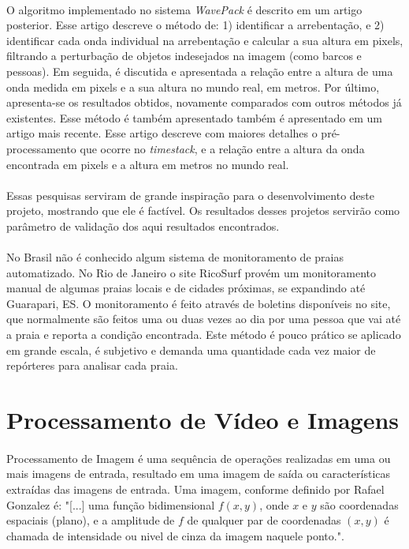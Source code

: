 \paragraph{}O algoritmo implementado no sistema \textit{WavePack} é descrito em um artigo \cite{Griffith11} posterior. Esse artigo descreve o método de: 1) identificar a arrebentação, e 2) identificar cada onda individual na arrebentação e calcular a sua altura em pixels, filtrando a perturbação de objetos indesejados na imagem (como barcos e pessoas). Em seguida, é discutida e apresentada a relação entre a altura de uma onda medida em pixels e a sua altura no mundo real, em metros. Por último, apresenta-se os resultados obtidos, novamente comparados com outros métodos já existentes. Esse método é também apresentado também é apresentado em um artigo \cite{Griffith14} mais recente. Esse artigo descreve com maiores detalhes o pré-processamento que ocorre no \textit{timestack}, e a relação entre a altura da onda encontrada em pixels e a altura em metros no mundo real.
\paragraph{}Essas pesquisas serviram de grande inspiração para o desenvolvimento deste projeto, mostrando que ele é factível. Os resultados desses projetos servirão como parâmetro de validação dos aqui resultados encontrados.
\paragraph{}No Brasil não é conhecido algum sistema de monitoramento de praias automatizado. No Rio de Janeiro o site RicoSurf\cite{Rico17} provém um monitoramento manual de algumas praias locais e de cidades próximas, se expandindo até Guarapari, ES. O monitoramento é feito através de boletins disponíveis no site, que normalmente são feitos uma ou duas vezes ao dia por uma pessoa que vai até a praia e reporta a condição encontrada. Este método é pouco prático se aplicado em grande escala, é subjetivo e demanda uma quantidade cada vez maior de repórteres para analisar cada praia. 
\section{Processamento de Vídeo e Imagens}
\paragraph{}Processamento de Imagem é uma sequência de operações realizadas em uma ou mais imagens de entrada, resultado em uma imagem de saída ou características extraídas das imagens de entrada. Uma imagem, conforme definido por Rafael Gonzalez \cite{Gonzalez92} é: "[...] uma função bidimensional \(f(x,y)\), onde \(x\) e \(y\) são coordenadas espaciais (plano), e a amplitude de \(f\) de qualquer par de coordenadas \((x,y)\) é chamada de intensidade ou nivel de cinza da imagem naquele ponto.".
